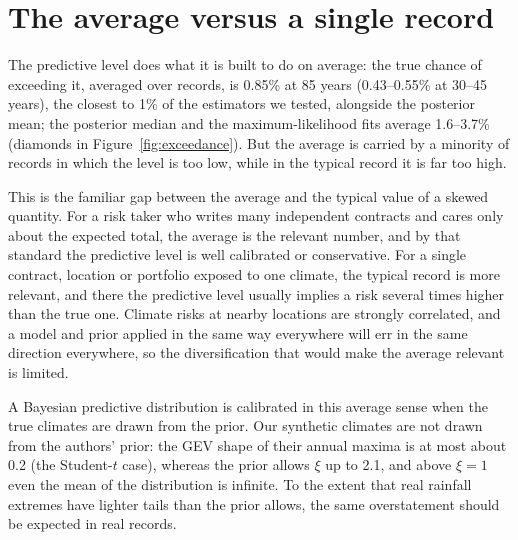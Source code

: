 \documentclass[11pt]{article}
\begin{document}
\begin{table}[H]
\centering\small\setlength{\tabcolsep}{3.5pt}
\caption{The predictive level at 85 years by kind of change and by distribution: median true
exceedance, shares (\%) understated and overstated by more than a factor of 2, and missed; right,
the share missed by other estimators on the same records.}\label{tab:groups}

\end{table}

\section{The average versus a single record}\label{sec:average}

The predictive level does what it is built to do on average: the true chance of exceeding it,
averaged over records, is 0.85\% at 85 years (0.43--0.55\% at 30--45 years), the closest to 1\% of
the estimators we tested, alongside the posterior mean; the posterior median and the
maximum-likelihood fits average 1.6--3.7\% (diamonds in Figure~\ref{fig:exceedance}).
But the average is carried by a minority of records in which the level is too low, while in the
typical record it is far too high.

This is the familiar gap between the average and the typical value of a skewed quantity. For a
risk taker who writes many independent contracts and cares only about the expected total, the
average is the relevant number, and by that standard the predictive level is well calibrated or
conservative. For a single contract, location or portfolio exposed to one climate, the typical
record is more relevant, and there the predictive level usually implies a risk several times
higher than the true one. Climate risks at nearby locations are strongly correlated, and a model and
prior applied in the same way everywhere will err in the same direction everywhere, so the
diversification that would make the average relevant is limited.

A Bayesian predictive distribution is calibrated in this average sense when the true climates are
drawn from the prior. Our synthetic climates are not drawn from the authors' prior: the GEV shape
of their annual maxima is at most about 0.2 (the Student-$t$ case), whereas the prior allows $\xi$
up to 2.1, and above $\xi=1$ even the mean of the distribution is infinite. To the extent that real
rainfall extremes have lighter tails than the prior allows, the same overstatement should be
expected in real records.
\end{document}

